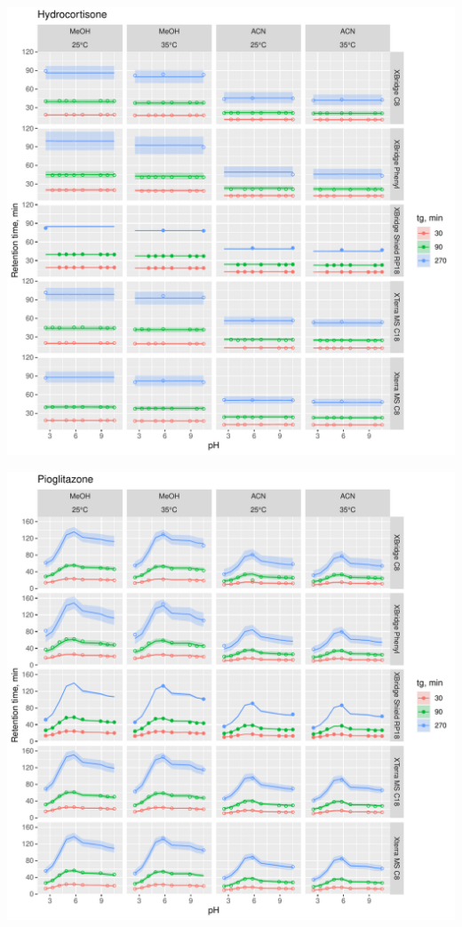 \documentclass[
]{article}
\begin{document}
\newpage{}

\includegraphics{../figures/casestudy2/concordanceplots/Hydrocortisone.pdf}

\newpage{}

\includegraphics{../figures/casestudy2/concordanceplots/Pioglitazone.pdf}
\end{document}

